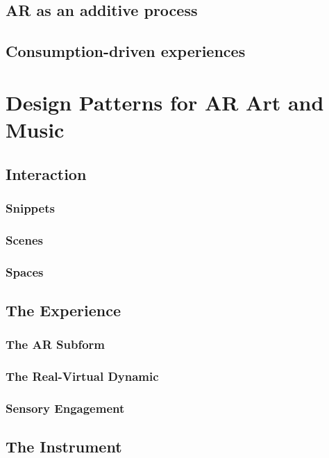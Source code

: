 \subsection{AR as an additive process}\label{sec: method-resistance-additive}

\subsection{Consumption-driven experiences}\label{sec: method-resistance-consumer}


\section{Design Patterns for AR Art and Music}
\subsection{Interaction}
\subsubsection{Snippets}
\subsubsection{Scenes}
\subsubsection{Spaces}

\subsection{The Experience}
\subsubsection{The AR Subform}
\subsubsection{The Real-Virtual Dynamic}
\subsubsection{Sensory Engagement}

\subsection{The Instrument}
